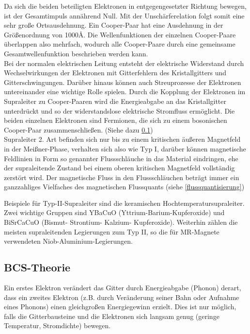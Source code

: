 \documentclass[12pt]{article}
\begin{document}
Da sich die beiden beteiligten Elektronen in entgegengesetzter Richtung bewegen, ist der Gesamtimpuls annährend Null.
Mit der Unschärferelation folgt somit eine sehr große Ortsausdehnung. Ein Cooper-Paar hat eine Ausdehnung in der Größenordnung von 1000\AA. Die Wellenfunktionen der einzelnen Cooper-Paare überlappen also mehrfach, wodurch alle Cooper-Paare durch eine gemeinsame Gesamtwellenfunktion beschrieben werden kann.\\

Bei der normalen elektrischen Leitung entsteht der elektrische Widerstand durch Wechselwirkungen der Elektronen mit Gitterfehlern des Kristallgitters und Gitterschwingungen. Darüber hinaus können auch Streuprozesse der Elektronen untereinander eine wichtige Rolle spielen. Durch die Kopplung der Elektronen im Supraleiter zu Cooper-Paaren wird die Energieabgabe an das Kristallgitter unterdrückt und so der widerstandslose elektrische Stromfluss ermöglicht. Die beiden einzelnen Elektronen sind Fermionen, die sich zu einem bosonischen Cooper-Paar zusammenschließen. (Siehe dazu \ref{bcs})\\

Supraleiter 2. Art befinden sich nur bis zu einem kritischen äußeren Magnetfeld in der Meißner-Phase, verhalten sich also wie Typ I, darüber können magnetische Feldlinien in Form so genannter Flussschläuche in das Material eindringen, ehe der supraleitende Zustand bei einem oberen kritischen Magnetfeld vollständig zerstört wird. Der magnetische Fluss in den Flussschläuchen beträgt immer ein ganzzahliges Vielfaches des magnetischen Flussquants (siehe \ref{flussquantisierung})

Beispiele für Typ-II-Supraleiter sind die keramischen Hochtemperatursupraleiter. Zwei wichtige Gruppen sind YBaCuO (Yttrium-Barium-Kupferoxide) und BiSrCaCuO (Bismut- Strontium- Kalzium- Kupferoxide). Weiterhin zählen die meisten supraleitenden Legierungen zum Typ II, so die für MR-Magnete verwendeten Niob-Aluminium-Legierungen.

\subsection{BCS-Theorie}
\label{bcs}
Ein erstes Elektron verändert das Gitter durch Energieabgabe (Phonon) derart, dass ein zweites Elektron (z.B. durch Veränderung seiner Bahn oder Aufnahme eines Phonons) einen gleichgroßen Energiegewinn erzielt. Dies ist nur möglich, falls die Gitterbausteine und die Elektronen sich langsam genug (geringe  Temperatur, Stromdichte) bewegen.\\
\end{document}
